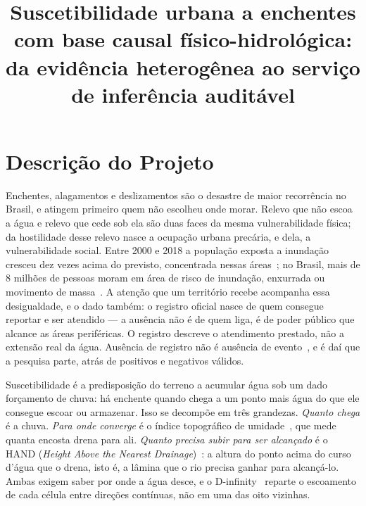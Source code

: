 \documentclass[conference]{IEEEtran}
\begin{document}
\title{Suscetibilidade urbana a enchentes com base causal
físico-hidrológica: da evidência heterogênea ao serviço de inferência
auditável}

\author{
}

\maketitle

\section{Descrição do Projeto}

Enchentes, alagamentos e deslizamentos são o desastre de maior recorrência no
Brasil, e atingem primeiro quem não escolheu onde morar. Relevo que não escoa
a água e relevo que cede sob ela são duas faces da mesma vulnerabilidade
física; da hostilidade desse relevo nasce a ocupação urbana precária, e dela,
a vulnerabilidade social. Entre 2000 e 2018 a população exposta a inundação
cresceu dez vezes acima do previsto, concentrada nessas áreas~\cite{tellman2021};
no Brasil, mais de 8 milhões de pessoas moram em área de risco de inundação,
enxurrada ou movimento de massa~\cite{ibge2018risco}. A atenção que um território recebe acompanha
essa desigualdade, e o dado também: o registro oficial nasce de quem consegue
reportar e ser atendido --- a ausência não é de quem liga, é de poder público que
alcance as áreas periféricas. O registro descreve o atendimento prestado, não a
extensão real da água. Ausência de registro não é ausência de
evento~\cite{li2022pul,agostini2024}, e é daí que a pesquisa parte, atrás de
positivos e negativos válidos.

Suscetibilidade é a predisposição do terreno a acumular água sob um dado
forçamento de chuva: há enchente quando chega a um ponto mais água do que ele
consegue escoar ou armazenar. Isso se decompõe em três grandezas. \emph{Quanto chega} é a chuva. \emph{Para onde
converge} é o índice topográfico de umidade~\cite{beven1979}, que mede quanta
encosta drena para ali. \emph{Quanto precisa subir para ser alcançado} é
o HAND (\emph{Height Above the Nearest Drainage})~\cite{renno2008}: a altura do ponto acima do curso d'água que o drena, isto
é, a lâmina que o rio precisa ganhar para alcançá-lo. Ambas exigem saber por
onde a água desce, e o D-infinity~\cite{tarboton1997} reparte o escoamento de
cada célula entre direções contínuas, não em uma das oito vizinhas.
\end{document}
